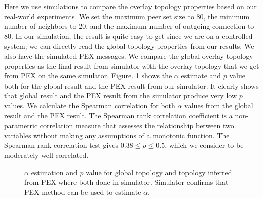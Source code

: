 \documentclass[10pt,conference,letterpaper]{IEEEtran}
\begin{document}
Here we use simulations to compare the overlay topology properties based  on our real-world experiments. 
We set the maximum peer set size to 80, the minimum number of neighbors to 20, and the maximum number of outgoing connection to 80. In our simulation, the result is quite easy to get since we are on a controlled system;  we can directly read the  global topology properties from our results. 
We also have the simulated PEX messages. We compare the global overlay topology properties as the final result from simulator with the overlay topology that we get from PEX on the same simulator.
Figure. \ref{fig:simulation} shows the $\alpha$ estimate and $p$ value both for the global result and the PEX result from our simulator. 
It clearly shows that global result and the PEX result from the simulator produce very low $p$ values. 
We calculate the Spearman correlation for both $\alpha$ values from the global result and the PEX result. 
The Spearman rank correlation coefficient is a non-parametric correlation measure that assesses the relationship between two variables
without making any assumptions of a monotonic function.
The Spearman rank correlation test gives $0.38 \leq \rho \leq 0.5$, which we consider to be moderately well correlated. 

\begin{figure}
\centering
{}
\caption{$\alpha$ estimation and $p$ value for global topology and topology inferred from PEX where both done in simulator.
Simulator confirms that PEX method can be used to estimate $\alpha$.} 
\label{fig:simulation}
\end{figure}
\end{document}
